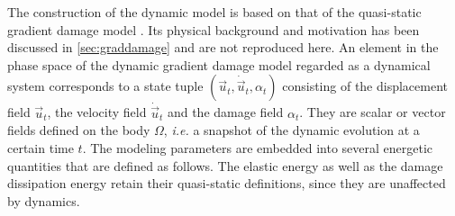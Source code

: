 The construction of the dynamic model is based on that of the quasi-static gradient damage model \cite{PhamMarigo:2010-1,PhamAmorMarigoMaurini:2011}. Its physical background and motivation has been discussed in \cref{sec:graddamage} and are not reproduced here. An element in the phase space of the dynamic gradient damage model regarded as a dynamical system corresponds to a state tuple $(\vec{u}_t,\dot{\vec{u}}_t,\alpha_t)$ consisting of the displacement field $\vec{u}_t$, the velocity field $\dot{\vec{u}}_t$ and the damage field $\alpha_t$. They are scalar or vector fields defined on the body $\Omega$, \emph{i.e.} a snapshot of the dynamic evolution at a certain time $t$. The modeling parameters are embedded into several energetic quantities that are defined as follows. The elastic energy as well as the damage dissipation energy retain their quasi-static definitions, since they are unaffected by dynamics.
